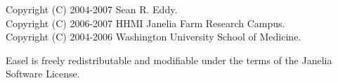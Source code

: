\vspace*{\fill}
\begin{flushleft}
Copyright (C) 2004-2007 Sean R. Eddy.\\
Copyright (C) 2006-2007 HHMI Janelia Farm Research Campus.\\
Copyright (C) 2004-2006 Washington University School of Medicine.\\
\end{flushleft}

\vspace{2em} 

Easel is freely redistributable and modifiable under the terms of the
Janelia Software License.








